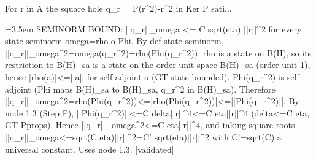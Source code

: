 \documentclass{article}
\newcommand{\step}[1]{\par\noindent\hangindent=3.5em\hangafter=1%
  \makebox[3.5em][l]{\textbf{#1.}}}
\newcommand{\steptag}[1]{\hfill{\small\textsf{[#1]}}}
\begin{document}
\begin{proofbox}{For r in A the square hole q\_r = P(r\textasciicircum{}2)-r\textasciicircum{}2 in Ker P sati...}
\step{1.4} SEMINORM BOUND: ||q\_r||\_omega <= C sqrt(eta) ||r||\textasciicircum{}2 for every state seminorm omega=rho o Phi. By def-state-seminorm, ||q\_r||\_omega\textasciicircum{}2=omega(q\_r\textasciicircum{}2)=rho(Phi(q\_r\textasciicircum{}2)). rho is a state on B(H), so its restriction to B(H)\_sa is a state on the order-unit space B(H)\_sa (order unit 1), hence |rho(a)|<=||a|| for self-adjoint a (GT-state-bounded). Phi(q\_r\textasciicircum{}2) is self-adjoint (Phi maps B(H)\_sa to B(H)\_sa, q\_r\textasciicircum{}2 in B(H)\_sa). Therefore ||q\_r||\_omega\textasciicircum{}2=rho(Phi(q\_r\textasciicircum{}2))<=|rho(Phi(q\_r\textasciicircum{}2))|<=||Phi(q\_r\textasciicircum{}2)||. By node 1.3 (Step F), ||Phi(q\_r\textasciicircum{}2)||<=C delta||r||\textasciicircum{}4<=C eta||r||\textasciicircum{}4 (delta<=C eta, GT-Pprops). Hence ||q\_r||\_omega\textasciicircum{}2<=C eta||r||\textasciicircum{}4, and taking square roots ||q\_r||\_omega<=sqrt(C eta)||r||\textasciicircum{}2=C' sqrt(eta)||r||\textasciicircum{}2 with C'=sqrt(C) a universal constant. Uses node 1.3. \steptag{validated} \\[4pt]
\end{proofbox}
\end{document}
